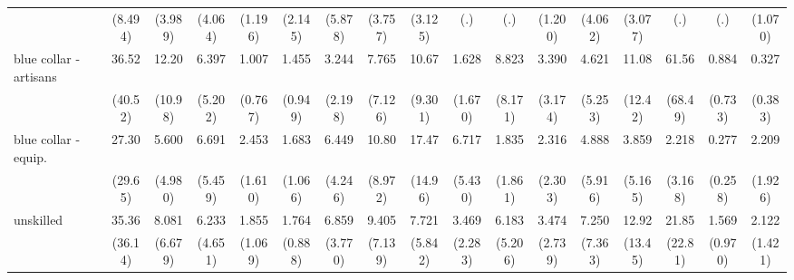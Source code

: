 {\begin{tabular}{l*{16}{c}}
                    &     (8.494)         &     (3.989)         &     (4.064)         &     (1.196)         &     (2.145)         &     (5.878)         &     (3.757)         &     (3.125)         &         (.)         &         (.)         &     (1.200)         &     (4.062)         &     (3.077)         &         (.)         &         (.)         &     (1.070)         \\
[1em]
blue collar - artisans&       36.52\sym{**} &       12.20\sym{**} &       6.397\sym{*}  &       1.007         &       1.455         &       3.244         &       7.765\sym{*}  &       10.67\sym{**} &       1.628         &       8.823\sym{*}  &       3.390         &       4.621         &       11.08\sym{*}  &       61.56\sym{***}&       0.884         &       0.327         \\
                    &     (40.52)         &     (10.98)         &     (5.202)         &     (0.767)         &     (0.949)         &     (2.198)         &     (7.126)         &     (9.301)         &     (1.670)         &     (8.171)         &     (3.174)         &     (5.253)         &     (12.42)         &     (68.49)         &     (0.733)         &     (0.383)         \\
[1em]
blue collar - equip.&       27.30\sym{**} &       5.600         &       6.691\sym{*}  &       2.453         &       1.683         &       6.449\sym{**} &       10.80\sym{**} &       17.47\sym{***}&       6.717\sym{*}  &       1.835         &       2.316         &       4.888         &       3.859         &       2.218         &       0.277         &       2.209         \\
                    &     (29.65)         &     (4.980)         &     (5.459)         &     (1.610)         &     (1.066)         &     (4.246)         &     (8.972)         &     (14.96)         &     (5.430)         &     (1.861)         &     (2.303)         &     (5.916)         &     (5.165)         &     (3.168)         &     (0.258)         &     (1.926)         \\
[1em]
unskilled           &       35.36\sym{***}&       8.081\sym{*}  &       6.233\sym{*}  &       1.855         &       1.764         &       6.859\sym{***}&       9.405\sym{**} &       7.721\sym{**} &       3.469         &       6.183\sym{*}  &       3.474         &       7.250         &       12.92\sym{*}  &       21.85\sym{**} &       1.569         &       2.122         \\
                    &     (36.14)         &     (6.679)         &     (4.651)         &     (1.069)         &     (0.888)         &     (3.770)         &     (7.139)         &     (5.842)         &     (2.283)         &     (5.206)         &     (2.739)         &     (7.363)         &     (13.45)         &     (22.81)         &     (0.970)         &     (1.421)         \\

\end{tabular}}

